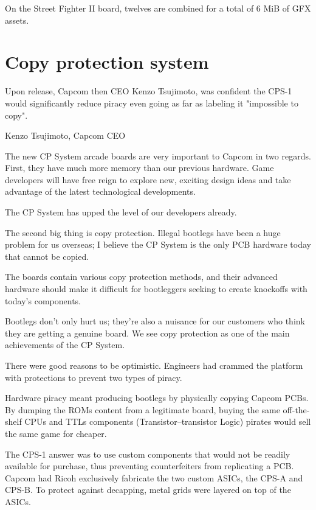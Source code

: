 
On the Street Fighter II board, twelves  are combined for a total of 6 MiB of GFX assets.


\section{Copy protection system}

Upon release, Capcom then CEO Kenzo Tsujimoto, was confident the CPS-1 would significantly reduce piracy even going as far as labeling it "impossible to copy".

\begin{q}{Kenzo Tsujimoto, Capcom CEO\cite{gamest38}}
    
The new CP System arcade boards are very important to Capcom in two regards. First, they have much more memory than our previous hardware. Game developers will have free reign to explore new, exciting design ideas and take advantage of the latest technological developments. 

The CP System has upped the level of our developers already.

The second big thing is copy protection. Illegal bootlegs have been a huge problem for us overseas; I believe the CP System is the only PCB hardware today that cannot be copied.

The boards contain various copy protection methods, and their advanced hardware should make it difficult for bootleggers seeking to create knockoffs with today's components. 

Bootlegs don't only hurt us; they're also a nuisance for our customers who think they are getting a genuine board. We see copy protection as one of the main achievements of the CP System.
\end{q}


There were good reasons to be optimistic. Engineers had crammed the platform with protections to prevent two types of piracy.


Hardware piracy meant producing bootlegs by physically copying Capcom PCBs. By dumping the ROMs content from a legitimate board, buying the same off-the-shelf CPUs and TTLs components (Transistor–transistor Logic) pirates would sell the same game  for cheaper.

The CPS-1 answer was to use custom components that would not be readily available for purchase, thus preventing counterfeiters from replicating a PCB. Capcom had Ricoh exclusively fabricate the two custom ASICs, the CPS-A and CPS-B. To protect against decapping, metal grids were layered on top of the ASICs\cite{arcadeHackerCPS1Rev}. 


